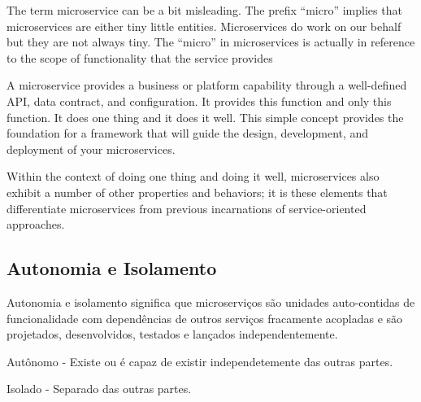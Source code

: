 The term microservice can be a bit misleading. The prefix “micro” implies that microservices are either tiny little entities. Microservices do work on our behalf but they are not always tiny. The “micro” in microservices is actually in reference to the scope of functionality that the service provides

A microservice provides a business or platform capability through a well-defined API, data contract, and configuration. It provides this function and only this function. It does one thing and it does it well. This simple concept provides the foundation for a framework that will guide the design, development, and deployment of your microservices.

Within the context of doing one thing and doing it well, microservices also exhibit a number of other properties and behaviors; it is these elements that differentiate microservices from previous incarnations of service-oriented approaches.

\subsection{Autonomia e Isolamento}
Autonomia e isolamento significa que microserviços são unidades auto-contidas de funcionalidade com dependências de outros serviços fracamente acopladas e são projetados, desenvolvidos, testados e lançados independentemente.

Autônomo - Existe ou é capaz de existir independetemente das outras partes.

Isolado - Separado das outras partes. 



